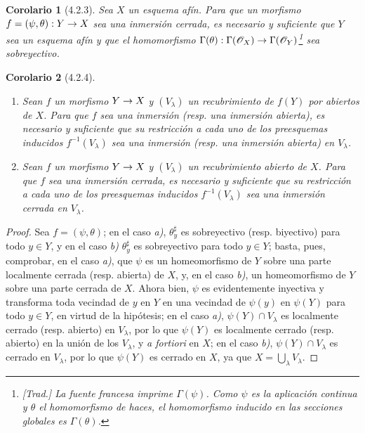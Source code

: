 \documentclass[oneside]{amsart}
\theoremstyle{ega-env-style}
\theoremstyle{ega-thm-env-style}
\newtheorem*{corollary}{Corolario}
\theoremstyle{ega-defn-env-style}
\renewcommand{\to}{\mathchoice{\longrightarrow}{\rightarrow}{\rightarrow}{\rightarrow}}
\newcommand{\oldpage}[2][]{{\marginnote{\normalfont{\textbf{#1}~|~#2}}}\ignorespaces}
\let\EGAOriginalLabel\label
\renewcommand{\label}[1]{\phantomsection\EGAOriginalLabel{#1}}
\begin{document}
\begin{corollary}[4.2.3]
\label{I.4.2.3}
Sea $X$ un esquema afín.
Para que un morfismo $f=(\psi,\theta):Y\to X$ sea una inmersión cerrada, es necesario y suficiente que $Y$ sea un esquema afín y que el homomorfismo $\Gamma(\theta):\Gamma(\mathscr{O}_X)\to\Gamma(\mathscr{O}_Y)$\footnote{\emph{[Trad.] La fuente francesa imprime $\Gamma(\psi)$. Como $\psi$ es la aplicación continua y $\theta$ el homomorfismo de haces, el homomorfismo inducido en las secciones globales es $\Gamma(\theta)$.}} sea sobreyectivo.
\end{corollary}

\begin{corollary}[4.2.4]
\label{I.4.2.4}
\medskip\noindent
\begin{enumerate}
  \item[\textup{a)}] Sean $f$ un morfismo $Y\to X$ y $(V_\lambda)$ un recubrimiento de $f(Y)$ por abiertos de $X$.
    Para que $f$ sea una inmersión (\textup{resp.} una inmersión abierta), es necesario y suficiente
\oldpage[I]{124}
    que su restricción a cada uno de los preesquemas inducidos $f^{-1}(V_\lambda)$ sea una inmersión (\textup{resp.} una inmersión abierta) en $V_\lambda$.
  \item[\textup{b)}] Sean $f$ un morfismo $Y\to X$ y $(V_\lambda)$ un recubrimiento abierto de $X$.
    Para que $f$ sea una inmersión cerrada, es necesario y suficiente que su restricción a cada uno de los preesquemas inducidos $f^{-1}(V_\lambda)$ sea una inmersión cerrada en $V_\lambda$.
\end{enumerate}
\end{corollary}

\begin{proof}
Sea $f=(\psi,\theta)$;
en el caso \emph{a)}, $\theta_y^\sharp$ es sobreyectivo (resp. biyectivo) para todo $y\in Y$, y en el caso \emph{b)} $\theta_y^\sharp$ es sobreyectivo para todo $y\in Y$;
basta, pues, comprobar, en el caso \emph{a)}, que $\psi$ es un homeomorfismo de $Y$ sobre una parte localmente cerrada (resp. abierta) de $X$, y, en el caso \emph{b)}, un homeomorfismo de $Y$ sobre una parte cerrada de $X$.
Ahora bien, $\psi$ es evidentemente inyectiva y transforma toda vecindad de $y$ en $Y$ en una vecindad de $\psi(y)$ en $\psi(Y)$ para todo $y\in Y$, en virtud de la hipótesis;
en el caso \emph{a)}, $\psi(Y)\cap V_\lambda$ es localmente cerrado (resp. abierto) en $V_\lambda$, por lo que $\psi(Y)$ es localmente cerrado (resp. abierto) en la unión de los $V_\lambda$, y \emph{a fortiori} en $X$;
en el caso \emph{b)}, $\psi(Y)\cap V_\lambda$ es cerrado en $V_\lambda$, por lo que $\psi(Y)$ es cerrado en $X$, ya que $X=\bigcup_\lambda V_\lambda$.
\end{proof}
\end{document}
